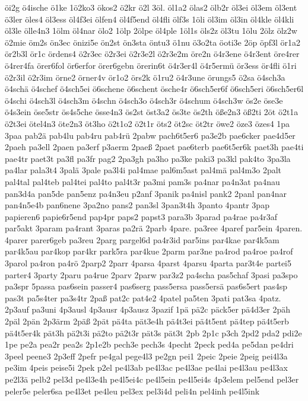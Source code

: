 {öi2g
ö4ische
ö1ke
1ö2ko3
ökos2
ö2kr
ö2l
3öl.
öl1a2
ölas2
ölb2r
öl3ei
öl3em
öl3ent
ö3ler
öles4
öl3ess
öl4f3ei
ölfen4
öl4f5end
öl4fli
ölf3s
1öli
öl3im
öl3in
öl4kle
öl4kli
öl3le
ölle4n3
1ölm
öl4nar
ölo2
1ölp
2ölpe
öl4ple
1öl1s
öls2z
öl3tu
1ölu
2ölz
ölz2w
ö2mie
öm2s
ön3ec
önizi5e
ön2st
ön3sta
öntu3
ö1nu
ö3o2ta
öoti3e
2öp
öpf3l
ör1a2
ör2b3l
ör1c
ördens4
ö2r3ec
ö2r3ei
ö2r3e2l
ö2r3e2m
öre2n
ö4r3ene
ö4r3ent
öre4rer
ö4rer4fa
örer6fol
ör6erfor
örer6gebn
örerin6t
ö4r3er4l
ö4r5ermü
ör3ess
ör4fli
ö1ri
ö2r3il
ö2r3im
örne2
örner4v
ör1o2
örs2k
ö1ru2
ö4r3une
örungs5
ö2sa
ö4sch3a
ö4schä
ö4schef
ö4sch5ei
ö6schene
ö6schent
ösche4r
ö6sch5er6f
ö6sch5eri
ö6sch5er6l
ö4schi
ö4sch3l
ö4sch3m
ö4schn
ö4sch3o
ö4sch3r
ö4schum
ö4sch3w
ös2e
öse3e
ö4s3ein
öse5str
ös4s5che
össe4n3
ös2st
öst3a2
ös3te
ös2th
öße2n3
öß2ti
2öt
ö2t1a
ö2t3ei
ötel4n3
öte2n3
öt3ho
ö2t1o2
ö2t1r
öts2
öt2sc
öt2tr
öwe2
öze3
özes4
1pa
3paa
pab2ä
pab4lu
pab4ru
pab4rü
2pabw
pach6t5er6
pa3e2b
pae6cker
pae4d5er
2paeh
pa3ell
2paen
pa3erf
p3aerm
2paeß
2paet
pae6terb
pae6t5er6k
paet3h
pae4ti
pae4tr
paet3t
pa3fl
pa3fr
pag2
2pa3gh
pa3ho
pa3ke
paki3
pa3kl
pak4to
3pa3la
pa4lar
pala3t4
3palä
3pale
pa3l4i
pal4mae
pal6m5ast
pal4mä
pal4m3o
2palt
pal4tal
pal4teb
pal4tei
pal4to
pal4t3r
pa3mi
pam3s
pa4nar
pa4n3at
pa4nau
pan3d4a
pan5de
pan5enz
pa4n3eu
p2anf
3panik
pa4nisl
pank2
2panl
pan4nar
pan4n5e4b
pan6nene
3pa2no
pans2
pan3sl
3pan3t4h
3panto
4pantr
3pap
papieren6
papie6r5end
pap4pr
paps2
papst3
para3b
3parad
pa4rae
pa4r3af
par5akt
3param
pa4rant
3paras
pa2rä
2parb
4pare.
pa3ree
4paref
par5ein
4paren.
4parer
parer6geb
pa3reu
2parg
pargel6d
pa4r3id
par5ins
par4kae
par4k5am
par4k5au
par4kop
par4kr
park5ra
par4kue
2parm
par3ne
pa4rod
pa4roe
pa4rof
3parol
pa4ron
pa4rö
2parp2
2parr
4parsa
4parst
4parsu
4parta
par3t4e
partei5
parter4
3party
2paru
pa4rue
2parv
2parw
par3z2
pa4scha
pas5chaf
3pasi
pa3spo
pa3spr
5passa
pas6sein
passer4
pas6serg
pass5ersa
pass5ersä
pas6s5ert
pas4sp
pas3t
pa5s4ter
pa3s4tr
2paß
pat2c
pat4e2
4patel
pa5ten
3pati
pat3sa
4patz.
2p3auf
pa3uni
4p3ausl
4p3ausr
4p3ausz
3pazif
1pä
pä2c
päck5er
pä4d3er
2päh
2päl
2pän
2p3ärm
2päß
2pät
pä4ta
pät3e4h
pä4t3ei
pä4t5ent
pä4tep
pä4t5erb
pä4t5er4k
pät3h
pä2t3i
pä2to
pä2t3r
pät3s
pät3t
2pb
2p1c
p3ch
2pd2
pda2
pdi2e
1pe
pe2a
pea2r
pea2s
2p1e2b
pech3e
pech3s
4pecht
2peck
ped4a
pe5dan
pe4dri
3peel
peene3
2p3eff
2pefr
pe4gal
pege4l3
pe2gn
pei1
2peic
2peie
2peig
pei4l3a
pe3im
4peis
peise5i
2pek
p2el
pe4l3ab
pe4l3ac
pe4l3ae
pe4lai
pe4l3au
pe4l3ax
pe2l3ä
pelb2
pel3d
pe4l3e4h
pe4l5ei4c
pe4l5ein
pe4l5ei4s
4p3elem
pel5end
pel3er
peler5e
peler6sa
pe4l3et
pe4leu
pel3ex
pel3i4d
peli4n
pel4inh
pe4l5ink
}
